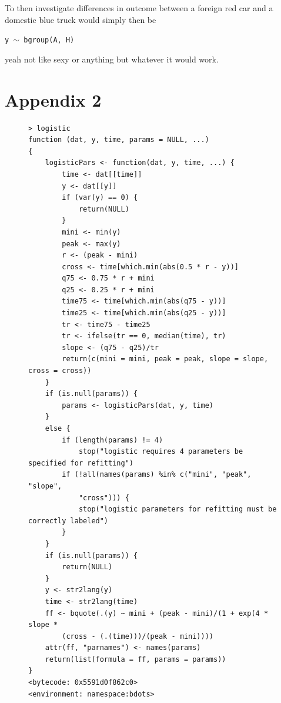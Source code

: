 To then investigate differences in outcome between a foreign red car and a domestic blue truck would simply then be

\begin{center}
\tt y $\sim$ bgroup(A, H)
\end{center}

yeah not like sexy or anything but whatever it would work.


\section{Appendix 2}


\begin{singlespace}
\begin{figure}[H]
\centering
\begin{BVerbatim}
> logistic
function (dat, y, time, params = NULL, ...) 
{
    logisticPars <- function(dat, y, time, ...) {
        time <- dat[[time]]
        y <- dat[[y]]
        if (var(y) == 0) {
            return(NULL)
        }
        mini <- min(y)
        peak <- max(y)
        r <- (peak - mini)
        cross <- time[which.min(abs(0.5 * r - y))]
        q75 <- 0.75 * r + mini
        q25 <- 0.25 * r + mini
        time75 <- time[which.min(abs(q75 - y))]
        time25 <- time[which.min(abs(q25 - y))]
        tr <- time75 - time25
        tr <- ifelse(tr == 0, median(time), tr)
        slope <- (q75 - q25)/tr
        return(c(mini = mini, peak = peak, slope = slope, cross = cross))
    }
    if (is.null(params)) {
        params <- logisticPars(dat, y, time)
    }
    else {
        if (length(params) != 4) 
            stop("logistic requires 4 parameters be specified for refitting")
        if (!all(names(params) %in% c("mini", "peak", "slope", 
            "cross"))) {
            stop("logistic parameters for refitting must be correctly labeled")
        }
    }
    if (is.null(params)) {
        return(NULL)
    }
    y <- str2lang(y)
    time <- str2lang(time)
    ff <- bquote(.(y) ~ mini + (peak - mini)/(1 + exp(4 * slope * 
        (cross - (.(time)))/(peak - mini))))
    attr(ff, "parnames") <- names(params)
    return(list(formula = ff, params = params))
}
<bytecode: 0x5591d0f862c0>
<environment: namespace:bdots>
\end{BVerbatim}
\end{figure}
\end{singlespace}





